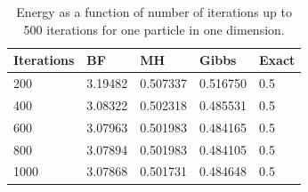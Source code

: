 \documentclass[norsk,a4paper,12pt]{article}
\begin{document}
\begin{table} [H]
	\caption{Energy as a function of number of iterations up to 500 iterations for one particle in one dimension. \vspace{2mm}}
	\begin{tabularx}{\textwidth}{X|XXXX} \hline\hline
		\label{tab:energies1P1D}
		Iterations & BF & MH & Gibbs & Exact \\ \hline
				200 & 3.19482 & 0.507337 & 0.516750 & 0.5 \\
				400 & 3.08322 & 0.502318 & 0.485531 & 0.5 \\
				600 & 3.07963 & 0.501983 & 0.484165 & 0.5 \\
				800 & 3.07894 & 0.501983 & 0.484105 & 0.5 \\
				1000 & 3.07868 & 0.501731 & 0.484648 & 0.5 \\ \hline
	\end{tabularx}
\end{table}
\end{document}
